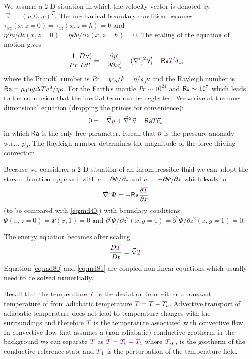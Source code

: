 We assume a 2-D situation in which the velocity vector is denoted by
$\vec\upnu=(u,0,w)^T$. The mechanical boundary condition becomes
$\tau_{xz}(x,z=0)=\tau_{xz}(x,z=h)=0$ and 
$\eta \partial u/\partial z (x,z=0) = \eta \partial u/\partial z (x,z=h) = 0$.
The scaling of the equation of motion gives
\begin{equation}
\frac{1}{Pr} \frac{D\upnu_i'}{Dt'} = -\frac{\partial {\color{violet} p'}}{\partial \partial x_i'}
+(\nabla')^2 \upnu_i' - {\mathsf{Ra}} {\color{violet}T'} \delta_{zi}
\label{eq:md78}
\end{equation}
where the Prandtl number is $Pr=\eta c_p/k= \eta/\rho_0 \kappa$ and the 
Rayleigh number is ${\mathsf{Ra}}=\rho_0 \alpha g \Delta T h^3 / \eta \kappa$.
For the Earth's mantle $Pr \sim 10^{24}$ and ${\mathsf{Ra}}\sim 10^7$ 
which leads to the conclusion that the inertial
term can be neglected. We arrive at the non-dimensional equation (dropping the primes
for convenience):
\begin{equation}
0 = -\vec\nabla {\color{violet} p} + \vec\nabla^2 \vec\upnu - {\mathsf{Ra}} {\color{violet}T} \vec{e}_z
\label{eq:md79}
\end{equation}
in which ${\mathsf{Ra}}$ is the only free parameter. Recall that ${\color{violet}p}$ 
is the pressure anomaly w.r.t. $p_0$. 
The Rayleigh number determines the magnitude of the force driving convection.



Because we considerer a 2-D situation of an incompressible fluid we can adopt the stream
function approach with $u=\partial \Psi/\partial z$ and $w=-\partial \Psi/\partial x$ which 
leads to
\begin{equation}
\vec\nabla^4 \Psi = -{\mathsf{Ra}} \frac{\partial {\color{violet}T}}{\partial x}
\label{eq:md80}
\end{equation}
(to be compared with \eqref{eq:md40}) with boundary conditions $\Psi(x,z=0)=\Psi(x,1)=0$
and $\partial^2 \Psi/\partial z^2 (x,y=0)=\partial^2 \Psi/\partial z^2 (x,y=1)=0$.

The energy equation becomes after scaling
\begin{equation}
\frac{D{\color{violet}T}}{Dt} = \vec\nabla {\color{violet}T}
\label{eq:md81}
\end{equation}
Equation \eqref{eq:md80} and \eqref{eq:md81} are coupled non-linear equations
which usually need to be solved numerically.



Recall that the temperature ${\color{violet}T}$ 
is the deviation from either a constant temperature of from
adiabatic temperature ${\color{violet}T} = T-T_a$. 
Advective transport of adiabatic temperature does not
lead to temperature changes with the surroundings and therefore  ${\color{violet}T}$ is the temperature
associated with convective flow. In convective flow that assumes a (non-adiabatic)
conductive geotherm in the background we can separate ${\color{violet}T}$ 
as  ${\color{violet}T}={\color{violet}T_0}+{\color{violet}T_1}$ 
where  ${\color{violet}T}_0$ , is the
geotherm of the conductive reference state and 
 ${\color{violet}T}_1$ is the perturbation of the temperature
field.

